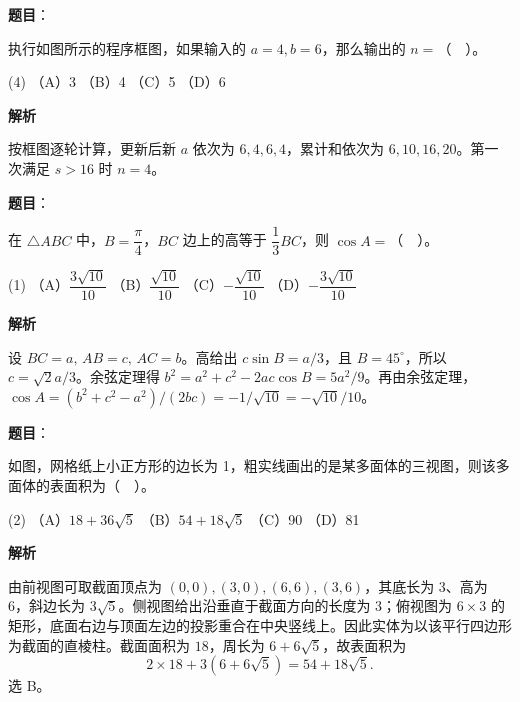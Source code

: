 \begin{answer}

\textbf{题目}：

执行如图所示的程序框图，如果输入的 \(a=4,b=6\)，那么输出的 \(n=\)（　）。

\begin{gkopts}(4)
\task （A）3
\task （B）4
\task （C）5
\task （D）6
\end{gkopts}
\nopagebreak[4]
\begin{center}\end{center}
\nopagebreak[4]
\textbf{解析}

按框图逐轮计算，更新后新 \(a\) 依次为 \(6,4,6,4\)，累计和依次为 \(6,10,16,20\)。第一次满足 \(s>16\) 时 \(n=4\)。


\end{answer}
\begin{answer}

\textbf{题目}：

在 \(\triangle ABC\) 中，\(B=\dfrac\pi4\)，\(BC\) 边上的高等于 \(\dfrac13BC\)，则 \(\cos A=\)（　）。

\begin{gkopts}(1)
\task （A）\(\dfrac{3\sqrt{10}}{10}\)
\task （B）\(\dfrac{\sqrt{10}}{10}\)
\task （C）\(-\dfrac{\sqrt{10}}{10}\)
\task （D）\(-\dfrac{3\sqrt{10}}{10}\)
\end{gkopts}

\textbf{解析}

设 \(BC=a,\,AB=c,\,AC=b\)。高给出 \(c\sin B=a/3\)，且 \(B=45^\circ\)，所以 \(c=\sqrt2a/3\)。余弦定理得 \(b^2=a^2+c^2-2ac\cos B=5a^2/9\)。再由余弦定理，\(\cos A=(b^2+c^2-a^2)/(2bc)=-1/\sqrt{10}=-\sqrt{10}/10\)。


\end{answer}
\begin{answer}

\textbf{题目}：

如图，网格纸上小正方形的边长为 1，粗实线画出的是某多面体的三视图，则该多面体的表面积为（　）。

\begin{gkopts}(2)
\task （A）\(18+36\sqrt5\)
\task （B）\(54+18\sqrt5\)
\task （C）90
\task （D）81
\end{gkopts}
\nopagebreak[4]
\begin{center}\end{center}
\nopagebreak[4]
\textbf{解析}

由前视图可取截面顶点为 \((0,0),(3,0),(6,6),(3,6)\)，其底长为 3、高为 6，斜边长为 \(3\sqrt5\)。侧视图给出沿垂直于截面方向的长度为 3；俯视图为 \(6\times3\) 的矩形，底面右边与顶面左边的投影重合在中央竖线上。因此实体为以该平行四边形为截面的直棱柱。截面面积为 \(18\)，周长为 \(6+6\sqrt5\)，故表面积为
\nopagebreak[4]
\[
2\times18+3(6+6\sqrt5)=54+18\sqrt5.
\]
选 B。


\end{answer}
